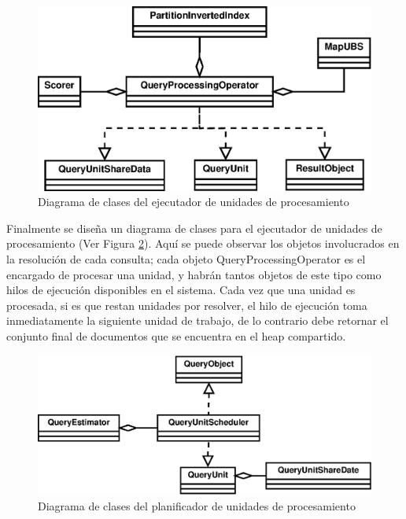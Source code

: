 \begin{figure}[!th]
\centering
\includegraphics[scale=.75]{images/QueryUnitExecuter.eps}
\caption{Diagrama de clases del ejecutador de unidades de procesamiento}
\label{fig:queryunit_scheduler}
\end{figure}

Finalmente se diseña un diagrama de clases para el ejecutador de unidades de procesamiento (Ver Figura \ref{fig:queryunit_scheduler}). Aquí se puede observar los objetos involucrados en la resolución de cada consulta; cada objeto QueryProcessingOperator es el encargado de procesar una unidad, y habrán tantos objetos de este tipo como hilos de ejecución disponibles en el sistema. Cada vez que una unidad es procesada, si es que restan unidades por resolver, el hilo de ejecución toma inmediatamente la siguiente unidad de trabajo, de lo contrario debe retornar el conjunto final de documentos que se encuentra en el heap compartido. 

\begin{figure}[!th]
\centering
\includegraphics[scale=.75]{images/QueryUnitScheduler.eps}
\caption{Diagrama de clases del planificador de unidades de procesamiento}
\label{fig:queryunit_scheduler}
\end{figure}